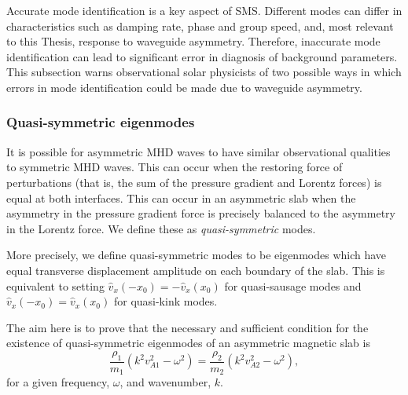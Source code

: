\documentclass[12pt]{../style-files/ociamthesis}
\begin{document}
Accurate mode identification is a key aspect of SMS. Different modes can differ in characteristics such as damping rate, phase and group speed, and, most relevant to this Thesis, response to waveguide asymmetry. Therefore, inaccurate mode identification can lead to significant error in diagnosis of background parameters. This subsection warns observational solar physicists of two possible ways in which errors in mode identification  could be made due to waveguide asymmetry.


\subsubsection{Quasi-symmetric eigenmodes}

It is possible for asymmetric MHD waves to have similar observational qualities to symmetric MHD waves. This can occur when the restoring force of perturbations (that is, the sum of the pressure gradient and Lorentz forces) is equal at both interfaces. This can occur in an asymmetric slab when the asymmetry in the pressure gradient force is precisely balanced to the asymmetry in the Lorentz force. We define these as \textit{quasi-symmetric} modes.

More precisely, we define quasi-symmetric modes to be eigenmodes which have equal transverse displacement amplitude on each boundary of the slab. This is equivalent to setting $\hat{v}_x (-x_0) = - \hat{v}_x (x_0)$ for quasi-sausage modes and $\hat{v}_x (-x_0) = \hat{v}_x (x_0)$ for quasi-kink modes.

The aim here is to prove that the necessary and sufficient condition for the existence of quasi-symmetric eigenmodes of an asymmetric magnetic slab is
\begin{equation}
\frac{\rho_1}{m_1}(k^2v_{A1}^2 - \omega^2) = \frac{\rho_2}{m_2}(k^2v_{A2}^2 - \omega^2), \label{quasi-sym condition}
\end{equation}
for a given frequency, $\omega$, and wavenumber, $k$.
\end{document}
